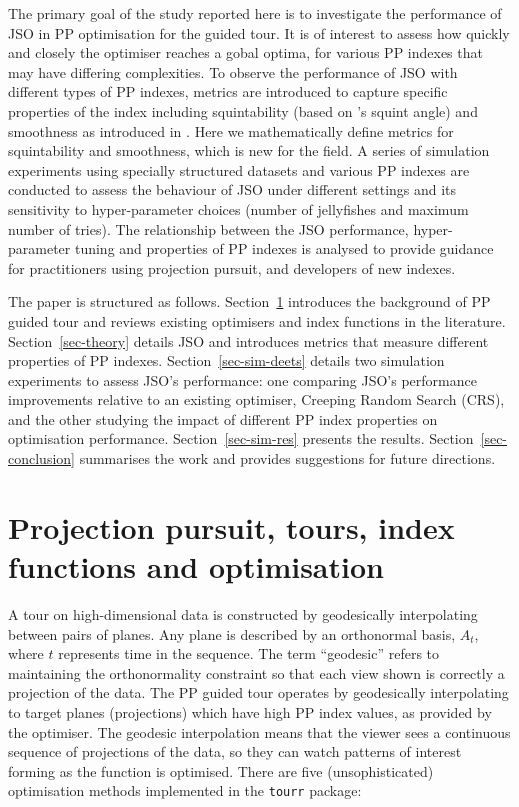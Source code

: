 \documentclass[
  number,
  preprint,
  3p]{elsarticle}
\begin{document}
The primary goal of the study reported here is to investigate the
performance of JSO in PP optimisation for the guided tour. It is of
interest to assess how quickly and closely the optimiser reaches a gobal
optima, for various PP indexes that may have differing complexities. To
observe the performance of JSO with different types of PP indexes,
metrics are introduced to capture specific properties of the index
including squintability (based on \citet{barnett1981interpreting}'s
squint angle) and smoothness as introduced in \citet{laa_using_2020}.
Here we mathematically define metrics for squintability and smoothness,
which is new for the field. A series of simulation experiments using
specially structured datasets and various PP indexes are conducted to
assess the behaviour of JSO under different settings and its sensitivity
to hyper-parameter choices (number of jellyfishes and maximum number of
tries). The relationship between the JSO performance, hyper-parameter
tuning and properties of PP indexes is analysed to provide guidance for
practitioners using projection pursuit, and developers of new indexes.

The paper is structured as follows. Section~\ref{sec-background}
introduces the background of PP guided tour and reviews existing
optimisers and index functions in the literature.
Section~\ref{sec-theory} details JSO and introduces metrics that measure
different properties of PP indexes. Section~\ref{sec-sim-deets} details
two simulation experiments to assess JSO's performance: one comparing
JSO's performance improvements relative to an existing optimiser,
Creeping Random Search (CRS), and the other studying the impact of
different PP index properties on optimisation performance.
Section~\ref{sec-sim-res} presents the results.
Section~\ref{sec-conclusion} summarises the work and provides
suggestions for future directions.

\section{Projection pursuit, tours, index functions and
optimisation}\label{sec-background}

A tour on high-dimensional data is constructed by geodesically
interpolating between pairs of planes. Any plane is described by an
orthonormal basis, \(A_t\), where \(t\) represents time in the sequence.
The term ``geodesic'' refers to maintaining the orthonormality
constraint so that each view shown is correctly a projection of the
data. The PP guided tour operates by geodesically interpolating to
target planes (projections) which have high PP index values, as provided
by the optimiser. The geodesic interpolation means that the viewer sees
a continuous sequence of projections of the data, so they can watch
patterns of interest forming as the function is optimised. There are
five (unsophisticated) optimisation methods implemented in the
\texttt{tourr} package:
\end{document}
